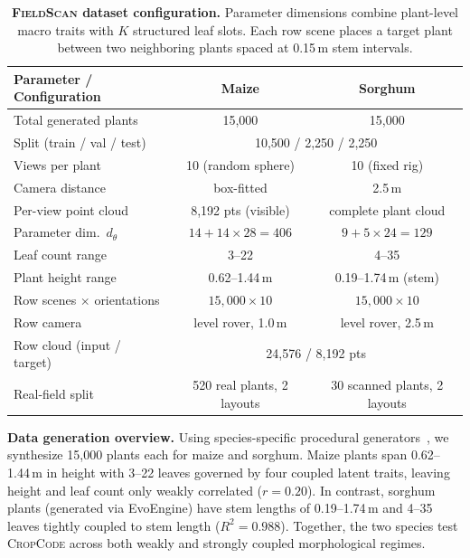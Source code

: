 \documentclass[10pt,twocolumn,letterpaper]{article}
\newcommand{\method}{\textsc{CropCode}}
\newcommand{\dataset}{\textsc{FieldScan}}
\begin{document}
\begin{table}[t]
  \caption{\textbf{\dataset{} dataset configuration.} Parameter dimensions combine plant-level macro traits with $K$ structured leaf slots. Each row scene places a target plant between two neighboring plants spaced at 0.15\,m stem intervals.}
  \label{tab:fieldproc}
  \centering\scriptsize
  \setlength{\tabcolsep}{3pt}
  \begin{tabular}{lcc}
    \toprule
    Parameter / Configuration & Maize & Sorghum \\
    \midrule
    Total generated plants & 15{,}000 & 15{,}000 \\
    Split (train / val / test) & \multicolumn{2}{c}{10{,}500 / 2{,}250 / 2{,}250} \\
    Views per plant & 10 (random sphere) & 10 (fixed rig) \\
    Camera distance & box-fitted & 2.5\,m \\
    Per-view point cloud & 8{,}192 pts (visible) & complete plant cloud \\
    Parameter dim.\ $d_\theta$ & $14{+}14{\times}28{=}406$ & $9{+}5{\times}24{=}129$ \\
    Leaf count range & 3--22 & 4--35 \\
    Plant height range & 0.62--1.44\,m & 0.19--1.74\,m (stem) \\
    Row scenes $\times$ orientations & $15{,}000 \times 10$ & $15{,}000 \times 10$ \\
    Row camera & level rover, 1.0\,m & level rover, 2.5\,m \\
    Row cloud (input / target) & \multicolumn{2}{c}{24{,}576 / 8{,}192 pts} \\
    Real-field split & 520 real plants, 2 layouts & 30 scanned plants, 2 layouts \\
    \bottomrule
  \end{tabular}
\end{table}

\noindent\textbf{Data generation overview.}
Using species-specific procedural generators~\citep{vazquez_phenoframe_2026,ostermann_sorghum_2024}, we synthesize 15{,}000 plants each for maize and sorghum. Maize plants span 0.62--1.44\,m in height with 3--22 leaves governed by four coupled latent traits, leaving height and leaf count only weakly correlated ($r = 0.20$). In contrast, sorghum plants (generated via EvoEngine) have stem lengths of 0.19--1.74\,m and 4--35 leaves tightly coupled to stem length ($R^2 = 0.988$). Together, the two species test \method{} across both weakly and strongly coupled morphological regimes.
\end{document}
